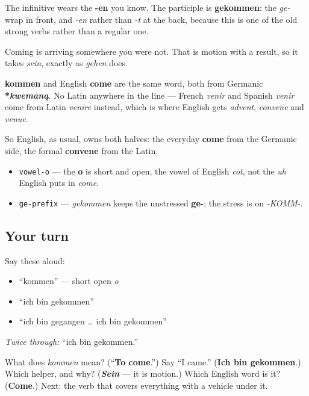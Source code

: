 The infinitive wears the \textbf{-en} you know. The participle is \textbf{gekommen}: the \emph{ge-} wrap in front, and \emph{-en} rather than \emph{-t} at the back, because this is one of the old strong verbs rather than a regular one.

Coming is arriving somewhere you were not. That is motion with a result, so it takes \emph{sein}, exactly as \emph{gehen} does.

\begin{cousinweb}
\textbf{kommen} and English \textbf{come} are the same word, both from Germanic \textbf{*\emph{kwemaną}}. No Latin anywhere in the line — French \emph{venir} and Spanish \emph{venir} come from Latin \emph{venīre} instead, which is where English gets \emph{advent}, \emph{convene} and \emph{venue}.

So English, as usual, owns both halves: the everyday \textbf{come} from the Germanic side, the formal \textbf{convene} from the Latin.
\end{cousinweb}

\begin{sounds}
\begin{itemize}
\raggedright
  \item \texttt{vowel-o} — the \textbf{o} is short and open, the vowel of English \emph{cot}, not the \emph{uh} English puts in \emph{come}.
  \item \texttt{ge-prefix} — \emph{gekommen} keeps the unstressed \textbf{ge-}; the stress is on \emph{-KOMM-}.
\end{itemize}
\end{sounds}

\subsection*{Your turn}
Say these aloud:

\begin{itemize}
\raggedright
  \item \textquotedblleft{}kommen\textquotedblright{} — short open \emph{o}
  \item \textquotedblleft{}ich bin gekommen\textquotedblright{}
  \item \textquotedblleft{}ich bin gegangen … ich bin gekommen\textquotedblright{}
\end{itemize}

\emph{Twice through:} \textquotedblleft{}ich bin gekommen.\textquotedblright{}

\begin{tcolorbox}[breakable,colback=teal!4,colframe=teal!35!black,title={Before you move on}]
What does \emph{kommen} mean? (\textquotedblleft{}\textbf{To come}.\textquotedblright{}) Say \textquotedblleft{}I came.\textquotedblright{} (\textbf{Ich bin gekommen}.) Which helper, and why? (\emph{\textbf{Sein}} — it is motion.) Which English word is it? (\textbf{Come}.) Next: the verb that covers everything with a vehicle under it.
\end{tcolorbox}

